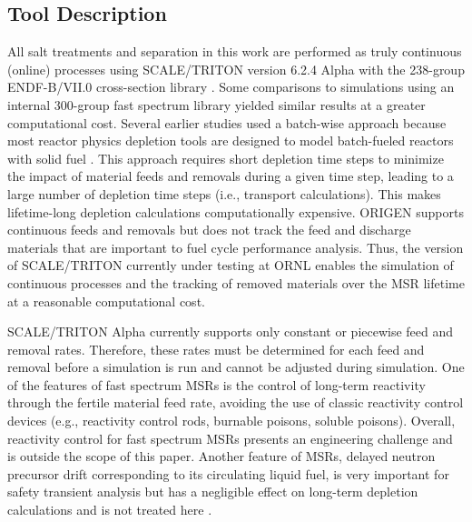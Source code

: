 \documentclass[letterpaper]{mandc2019}
\begin{document}
\subsection{Tool Description}
All salt treatments and separation in this work are performed as truly continuous (online) processes using SCALE/TRITON version 6.2.4 Alpha \cite{betzler_implementation_2017-1} with the 238-group ENDF-B/VII.0 cross-section library \cite{rearden_scale_2016}. 
Some comparisons to simulations using an internal 300-group fast spectrum library yielded similar results at a greater computational cost.
Several earlier studies used a batch-wise approach because most reactor physics depletion tools are designed to model batch-fueled reactors with solid fuel \cite{betzler_molten_2017,rykhlevskii_online_2017,rykhlevskii_modeling_2019}. 
This approach requires short depletion time steps to minimize the impact of material feeds and removals during a given time step, leading to a large number of depletion time steps (i.e., transport calculations). 
This makes lifetime-long depletion calculations computationally expensive. 
ORIGEN \cite{gauld_isotopic_2011} supports continuous feeds and removals but does not track the feed and discharge materials that are important to fuel cycle performance analysis. 
Thus, the version of SCALE/TRITON currently under testing at \gls{ORNL} enables the simulation of continuous processes and the tracking of removed materials over the \gls{MSR} lifetime at a reasonable computational cost. \par
SCALE/TRITON Alpha currently supports only constant or piecewise feed and removal rates. 
Therefore, these rates must be determined for each feed and removal before a simulation is run and cannot be adjusted during simulation. 
One of the features of fast spectrum \gls{MSR}s is the control of long-term reactivity through the fertile material feed rate, avoiding the use of classic reactivity control devices (e.g., reactivity control rods, burnable poisons, soluble poisons). 
Overall, reactivity control for fast spectrum \gls{MSR}s presents an engineering challenge and is outside the scope of this paper. 
Another feature of \gls{MSR}s, delayed neutron precursor drift corresponding to its circulating liquid fuel, is very important for safety transient analysis but has a negligible effect on long-term depletion calculations and is not treated here \cite{betzler_implementation_2017-1}. 
\end{document}
